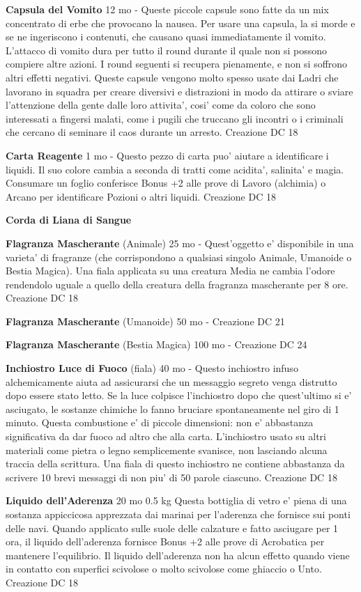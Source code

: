 \documentclass[a4paper,11pt,twoside,openany]{dndbook}
\begin{document}
{\textbf{Capsula del Vomito} 12 mo - Queste piccole capsule sono fatte da un mix concentrato di erbe che provocano la nausea. Per usare una capsula, la si morde e se ne ingeriscono i contenuti, che causano quasi immediatamente il vomito. L'attacco di vomito dura per tutto il round durante il quale non si possono compiere altre azioni. I round seguenti si recupera pienamente, e non si soffrono altri effetti negativi. Queste capsule vengono molto spesso usate dai Ladri che lavorano in squadra per creare diversivi e distrazioni in modo da attirare o sviare l'attenzione della gente dalle loro attivita', cosi' come da coloro che sono interessati a fingersi malati, come i pugili che truccano gli incontri o i criminali che cercano di seminare il caos durante un arresto. Creazione DC 18

\textbf{Carta Reagente} 1 mo - Questo pezzo di carta puo' aiutare a identificare i liquidi. Il suo colore cambia a seconda di tratti come acidita', salinita' e magia. Consumare un foglio conferisce Bonus +2 alle prove di Lavoro (alchimia) o Arcano per identificare Pozioni o altri liquidi. Creazione DC 18

\textbf{Corda di Liana di Sangue}

\textbf{Flagranza Mascherante} (Animale) 25 mo - Quest'oggetto e' disponibile in una varieta' di fragranze (che corrispondono a qualsiasi singolo Animale, Umanoide o Bestia Magica). Una fiala applicata su una creatura Media ne cambia l'odore rendendolo uguale a quello della creatura della fragranza mascherante per 8 ore. Creazione DC 18

\textbf{Flagranza Mascherante} (Umanoide) 50 mo - Creazione DC 21

\textbf{Flagranza Mascherante} (Bestia Magica) 100 mo - Creazione DC 24

\textbf{Inchiostro Luce di Fuoco} (fiala) 40 mo - Questo inchiostro infuso alchemicamente aiuta ad assicurarsi che un messaggio segreto venga distrutto dopo essere stato letto. Se la luce colpisce l'inchiostro dopo che quest'ultimo si e' asciugato, le sostanze chimiche lo fanno bruciare spontaneamente nel giro di 1 minuto. Questa combustione e' di piccole dimensioni: non e' abbastanza significativa da dar fuoco ad altro che alla carta. L'inchiostro usato su altri materiali come pietra o legno semplicemente svanisce, non lasciando alcuna traccia della scrittura. Una fiala di questo inchiostro ne contiene abbastanza da scrivere 10 brevi messaggi di non piu' di 50 parole ciascuno. Creazione DC 18

\textbf{Liquido dell'Aderenza} 20 mo 0.5 kg Questa bottiglia di vetro e' piena di una sostanza appiccicosa apprezzata dai marinai per l'aderenza che fornisce sui ponti delle navi. Quando applicato sulle suole delle calzature e fatto asciugare per 1 ora, il liquido dell'aderenza fornisce Bonus +2 alle prove di Acrobatica per mantenere l'equilibrio. Il liquido dell'aderenza non ha alcun effetto quando viene in contatto con superfici scivolose o molto scivolose come ghiaccio o Unto. Creazione DC 18

}
\end{document}

